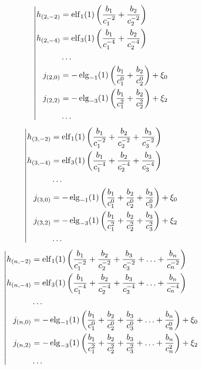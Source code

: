 \begin{equation*} \left| \begin{aligned}
h_{(2,-2)} &=
  \elf_1(1) \left(
  \frac{b_1}{c_1^{-2}}
+ \frac{b_2}{c_2^{-2}} \right) \\
%
h_{(2,-4)} &=
  \elf_3(1) \left(
  \frac{b_1}{c_1^{-4}}
+ \frac{b_2}{c_2^{-4}} \right) \\
%
&\ldots \\
%
j_{(2,0)} &=
- \elg_{-1}(1) \left(
  \frac{b_1}{c_1^0}
+ \frac{b_2}{c_2^0} \right)
+ \xi_0 \\
%
j_{(2,2)} &=
- \elg_{-3}(1) \left(
  \frac{b_1}{c_1^2}
+ \frac{b_2}{c_2^2} \right)
+ \xi_2 \\
%
&\ldots \\
\end{aligned} \right. \end{equation*}
%
\begin{equation*} \left| \begin{aligned}
%
h_{(3,-2)} &=
  \elf_1(1) \left(
  \frac{b_1}{c_1^{-2}}
+ \frac{b_2}{c_2^{-2}}
+ \frac{b_3}{c_3^{-2}} \right) \\
%
h_{(3,-4)} &=
  \elf_3(1) \left(
  \frac{b_1}{c_1^{-4}}
+ \frac{b_2}{c_2^{-4}}
+ \frac{b_3}{c_3^{-4}} \right) \\
%
&\ldots \\
%
j_{(3,0)} &=
- \elg_{-1}(1) \left(
  \frac{b_1}{c_1^0}
+ \frac{b_2}{c_2^0}
+ \frac{b_3}{c_3^0} \right)
+ \xi_0 \\
%
j_{(3,2)} &=
- \elg_{-3}(1) \left(
  \frac{b_1}{c_1^2}
+ \frac{b_2}{c_2^2}
+ \frac{b_3}{c_3^2} \right)
+ \xi_2 \\
%
&\ldots \\
\end{aligned} \right. \end{equation*}
%
\begin{equation*} \left| \begin{aligned}
h_{(n,-2)} &=
  \elf_1(1) \left(
  \frac{b_1}{c_1^{-2}}
+ \frac{b_2}{c_2^{-2}}
+ \frac{b_3}{c_3^{-2}}
+ \ldots
+ \frac{b_n}{c_n^{-2}} \right) \\
%
h_{(n,-4)} &=
  \elf_3(1) \left(
  \frac{b_1}{c_1^{-4}}
+ \frac{b_2}{c_2^{-4}}
+ \frac{b_3}{c_3^{-4}}
+ \ldots
+ \frac{b_n}{c_n^{-4}} \right) \\
%
&\ldots \\
%
j_{(n,0)} &=
- \elg_{-1}(1) \left(
  \frac{b_1}{c_1^0}
+ \frac{b_2}{c_2^0}
+ \frac{b_3}{c_3^0}
+ \ldots
+ \frac{b_n}{c_n^0} \right)
+ \xi_0 \\
%
j_{(n,2)} &=
- \elg_{-3}(1) \left(
  \frac{b_1}{c_1^2}
+ \frac{b_2}{c_2^2}
+ \frac{b_3}{c_3^2}
+ \ldots
+ \frac{b_n}{c_n^2} \right)
+ \xi_2 \\
%
&\ldots \\
\end{aligned} \right. \end{equation*}